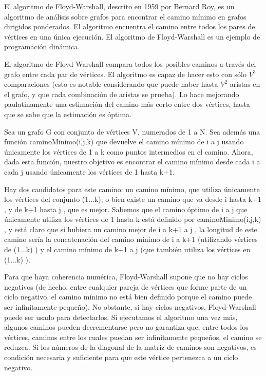 El algoritmo de Floyd-Warshall, descrito en 1959 por Bernard Roy, es un algoritmo de análisis sobre grafos para encontrar el camino mínimo en grafos dirigidos ponderados. El algoritmo encuentra el camino entre todos los pares de vértices en una única ejecución. El algoritmo de Floyd-Warshall es un ejemplo de programación dinámica.

El algoritmo de Floyd-Warshall compara todos los posibles caminos a través del grafo entre cada par de vértices. El algoritmo es capaz de hacer esto con sólo $V^{3}$ comparaciones (esto es notable considerando que puede haber hasta $V^{2}$ aristas en el grafo, y que cada combinación de aristas se prueba). Lo hace mejorando paulatinamente una estimación del camino más corto entre dos vértices, hasta que se sabe que la estimación es óptima.

Sea un grafo G con conjunto de vértices V, numerados de 1 a N. Sea además una función caminoMinimo(i,j,k) que devuelve el camino mínimo de i a j usando únicamente los vértices de 1 a k como puntos intermedios en el camino. Ahora, dada esta función, nuestro objetivo es encontrar el camino mínimo desde cada i a cada j usando únicamente los vértices de 1 hasta k+1.

Hay dos candidatos para este camino: un camino mínimo, que utiliza únicamente los vértices del conjunto (1...k); o bien existe un camino que va desde i hasta k+1 , y de k+1 hasta j , que es mejor. Sabemos que el camino óptimo de i a j que únicamente utiliza los vértices de 1 hasta k está definido por caminoMinimo(i,j,k)  , y está claro que si hubiera un camino mejor de i a k+1 a j , la longitud de este camino sería la concatenación del camino mínimo de i a k+1 (utilizando vértices de  (1...k) ) y el camino mínimo de k+1 a j (que también utiliza los vértices en  (1...k) ).

Para que haya coherencia numérica, Floyd-Warshall supone que no hay ciclos negativos (de hecho, entre cualquier pareja de vértices que forme parte de un ciclo negativo, el camino mínimo no está bien definido porque el camino puede ser infinitamente pequeño). No obstante, si hay ciclos negativos, Floyd-Warshall puede ser usado para detectarlos. Si ejecutamos el algoritmo una vez más, algunos caminos pueden decrementarse pero no garantiza que, entre todos los vértices, caminos entre los cuales puedan ser infinitamente pequeños, el camino se reduzca. Si los números de la diagonal de la matriz de caminos son negativos, es condición necesaria y suficiente para que este vértice pertenezca a un ciclo negativo.

